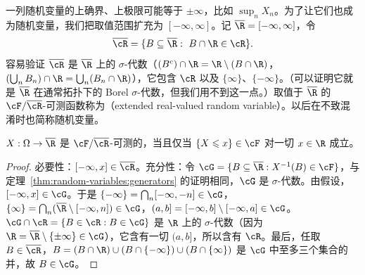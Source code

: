 
一列随机变量的上确界、上极限可能等于 $\pm\infty$，比如 $\sup_nX_n$。为了让它们也成为随机变量，我们把取值范围扩充为 $[-\infty,\infty]$。记 $\overline\R=[-\infty,\infty]$，令
\[
\overline\cR=\{B\subseteq\overline\R:\ B\cap\R\in\cR\}.
\]
容易验证 $\overline\cR$ 是 $\overline\R$ 上的 $\sigma$-代数（$(B^c)\cap\R=\R\setminus(B\cap\R)$，$(\bigcup_nB_n)\cap\R=\bigcup_n(B_n\cap\R)$），它包含 $\cR$ 以及 $\{\infty\}$、$\{-\infty\}$。（可以证明它就是 $\overline\R$ 在通常拓扑下的 Borel $\sigma$-代数，但我们用不到这一点。）取值于 $\overline\R$ 的 $\cF/\overline\cR$-可测函数称为（extended real-valued random variable）。以后在不致混淆时也简称随机变量。

\begin{proposition}\label{prop:random-variables:extended}
$X:\Omega\to\overline\R$ 是 $\cF/\overline\cR$-可测的，当且仅当 $\{X\leqslant x\}\in\cF$ 对一切 $x\in\R$ 成立。
\end{proposition}
\begin{proof}
必要性：$[-\infty,x]\in\overline\cR$。充分性：令 $\cG=\{B\subseteq\overline\R: X^{-1}(B)\in\cF\}$，与定理~\ref{thm:random-variables:generators} 的证明相同，$\cG$ 是 $\sigma$-代数。由假设，$[-\infty,x]\in\cG$。于是 $\{-\infty\}=\bigcap_n[-\infty,-n]\in\cG$，$\{\infty\}=\bigcap_n(\overline\R\setminus[-\infty,n])\in\cG$，$(a,b]=[-\infty,b]\setminus[-\infty,a]\in\cG$。$\cG\cap\cR=\{B\in\cR: B\in\cG\}$ 是 $\R$ 上的 $\sigma$-代数（因为 $\R=\overline\R\setminus\{\pm\infty\}\in\cG$），它含有一切 $(a,b]$，所以含有 $\cR$。最后，任取 $B\in\overline\cR$，$B=(B\cap\R)\cup(B\cap\{-\infty\})\cup(B\cap\{\infty\})$ 是 $\cG$ 中至多三个集合的并，故 $B\in\cG$。
\end{proof}

